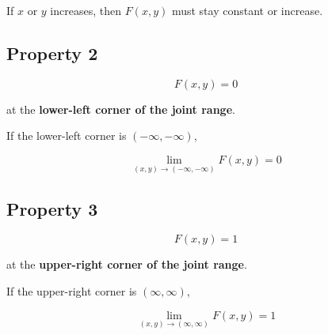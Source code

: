 \documentclass[12pt]{article}
\begin{document}
If $x$ or $y$ increases, then $F(x,y)$ must stay constant or increase.

\subsection*{Property 2}

\[
F(x,y)=0
\]

at the \textbf{lower-left corner of the joint range}.

If the lower-left corner is $(-\infty,-\infty)$,

\[
\lim_{(x,y)\to(-\infty,-\infty)} F(x,y)=0
\]

\subsection*{Property 3}

\[
F(x,y)=1
\]

at the \textbf{upper-right corner of the joint range}.

If the upper-right corner is $(\infty,\infty)$,

\[
\lim_{(x,y)\to(\infty,\infty)} F(x,y)=1
\]
\end{document}
